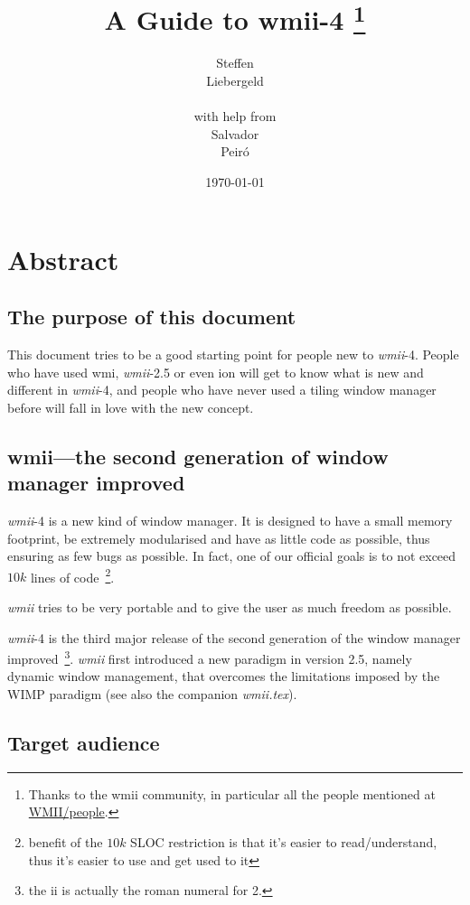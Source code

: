 \documentclass[12pt,a4paper]{article} %
\date{\today}
\author{
Steffen\\Liebergeld \\\\
\small{with help from}\\
Salvador\\Peir\'o
}
\title{A Guide to wmii-4%
\thanks{Thanks to the wmii community, in particular all the 
people mentioned at \href{http://suckless.org/index.php/WMII/People}{WMII/people}.}
}
\newcommand{\wmii}{\emph{wmii}}
\begin{document}
\maketitle

\tableofcontents

\newpage

\section{Abstract}

  \subsection{The purpose of this document}

    This document tries to be a good starting point for people new to
    \wmii-4.  People who have used wmi, \wmii-2.5 or even ion will get
    to know what is new and different in \wmii-4, and people who have
    never used a tiling window manager before will fall in love with
    the new concept.
  
  \subsection{wmii---the second generation of window manager improved}

    \wmii-4 is a new kind of window manager. It is designed to have a
    small memory footprint, be extremely modularised and have as
    little code as possible, thus ensuring as few bugs as possible. In
    fact, one of our official goals is to not exceed $10 k$ lines of
    code~\footnote{ benefit of the $10 k$ SLOC restriction is that
    it's easier to read/understand, thus it's easier to use and get
    used to it}.

    \wmii{} tries to be very portable and to give the user as much
    freedom as possible.

    \wmii-4 is the third major release of the second generation of the
    window manager improved~\footnote{ the ii is actually the roman
    numeral for 2.}.  \wmii{} first introduced a new paradigm in version
    2.5, namely dynamic window management, that overcomes the
    limitations imposed by the WIMP paradigm (see also the companion
    \emph{wmii.tex}).
  
  \subsection{Target audience}
\end{document}
